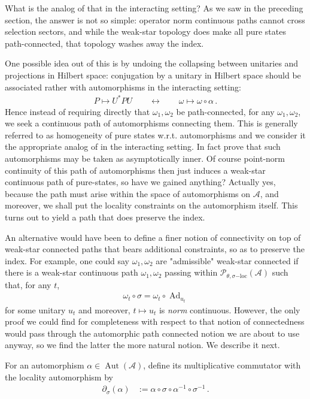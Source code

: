 \documentclass[a4paper,10pt]{article}
\numberwithin{equation}{section}
\theoremstyle{plain}
\theoremstyle{plain}
\theoremstyle{plain}
\theoremstyle{plain}
\theoremstyle{plain}
\theoremstyle{remark}
\theoremstyle{definition}
\newcommand{\calA}{\mathcal{A}}
\newcommand{\calP}{\mathcal{P}}
\newcommand{\Ad}[1]{\operatorname{Ad}_{#1}}
\newcommand{\eq}[1]{\begin{align*}#1\end{align*}}
\begin{document}
What is the analog of that in the interacting setting? As we saw in the preceding section, the answer is not so simple: operator norm continuous paths cannot cross selection sectors, and while the weak-star topology does make all pure states path-connected, that topology washes away the index.

One possible idea out of this is by undoing the collapsing between unitaries and projections in Hilbert space: conjugation by a unitary in Hilbert space should be associated rather with automorphisms in the interacting setting: \eq{
P\mapsto U^\ast P U \qquad \longleftrightarrow\qquad \omega\mapsto\omega\circ \alpha\,.
} Hence instead of requiring directly that $\omega_1,\omega_2$ be path-connected, for any $\omega_1,\omega_2$, we seek a continuous path of automorphisms connecting them. This is generally referred to as homogeneity of pure states w.r.t. automorphisms \cite{KishimotoOzawaSakai2003Homogeneity} and we consider it the appropriate analog of \cite{Kuiper1965HomotopyType} in the interacting setting. In fact \cite{KishimotoOzawaSakai2003Homogeneity} prove that such automorphisms may be taken as asymptotically inner. Of course point-norm continuity of this path of automorphisms then just induces a weak-star continuous path of pure-states, so have we gained anything? Actually yes, because the path must arise within the space of automorphisms on $\calA$, and moreover, we shall put the locality constraints on the automorphism itself. This turns out to yield a path that does preserve the index. 

An alternative would have been to define a finer notion of connectivity on top of weak-star connected paths that bears additional constraints, so as to preserve the index. For example, one could say $\omega_1,\omega_2$ are "admissible" weak-star connected if there is a weak-star continuous path $\omega_1,\omega_2$ passing within $\calP_{\theta,\sigma\mathrm{-loc}}(\calA)$ such that, for any $t$, 
\eq{
\omega_t\circ\sigma = \omega_t\circ\Ad{u_t}
} for some unitary $u_t$ and moreover, $t\mapsto u_t$ is \emph{norm} continuous. However, the only proof we could find for completeness with respect to that notion of connectedness would pass through the automorphic path connected notion we are about to use anyway, so we find the latter the more natural notion. We describe it next.

For an automorphism \(\alpha\in\operatorname{Aut}(\calA)\), define its
multiplicative commutator with the locality automorphism by
\eq{
    \partial_\sigma(\alpha)
    &:=
    \alpha\circ\sigma\circ\alpha^{-1}\circ\sigma^{-1}\,.
}
\end{document}
